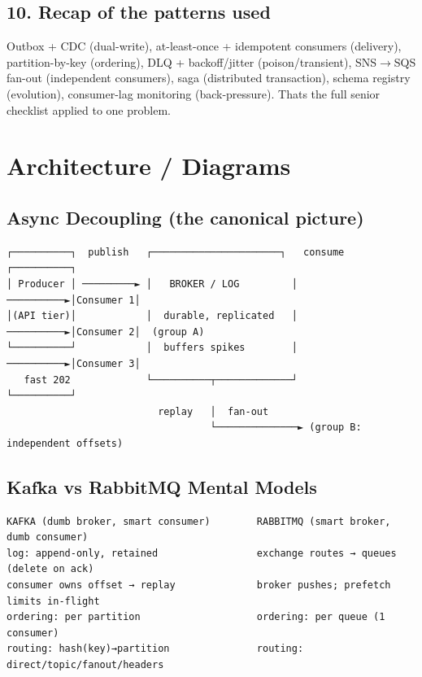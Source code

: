 \documentclass[11pt]{article}
\begin{document}
\subsection{10. Recap of the patterns used}\label{10-recap-of-the-patterns-used}

Outbox + CDC (dual-write), at-least-once + idempotent consumers (delivery), partition-by-key (ordering), DLQ + backoff/jitter (poison/transient), SNS\(\rightarrow\)SQS fan-out (independent consumers), saga (distributed transaction), schema registry (evolution), consumer-lag monitoring (back-pressure). That\textquotesingle s the full senior checklist applied to one problem.

\section{Architecture / Diagrams}\label{architecture--diagrams}

\subsection{Async Decoupling (the canonical picture)}\label{async-decoupling-the-canonical-picture}

\setcodelang{}

\begin{verbatim}
┌──────────┐  publish   ┌──────────────────────┐   consume   ┌──────────┐
│ Producer │ ─────────► │   BROKER / LOG         │ ──────────►│Consumer 1│
│(API tier)│            │  durable, replicated   │ ──────────►│Consumer 2│  (group A)
└──────────┘            │  buffers spikes        │ ──────────►│Consumer 3│
   fast 202             └──────────┬─────────────┘            └──────────┘
                          replay   │  fan-out
                                   └──────────────► (group B: independent offsets)
\end{verbatim}

\subsection{Kafka vs RabbitMQ Mental Models}\label{kafka-vs-rabbitmq-mental-models}

\setcodelang{}

\begin{verbatim}
KAFKA (dumb broker, smart consumer)        RABBITMQ (smart broker, dumb consumer)
log: append-only, retained                 exchange routes → queues (delete on ack)
consumer owns offset → replay              broker pushes; prefetch limits in-flight
ordering: per partition                    ordering: per queue (1 consumer)
routing: hash(key)→partition               routing: direct/topic/fanout/headers
\end{verbatim}
\end{document}
